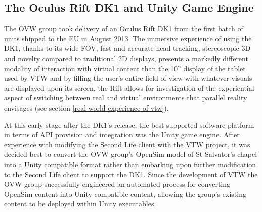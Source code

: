 


\subsection{The Oculus Rift DK1 and Unity Game Engine}

The OVW group took delivery of an Oculus Rift DK1 from the first batch of units shipped to the EU in August 2013. The immersive experience of using the DK1, thanks to its wide FOV, fast and accurate head tracking, stereoscopic 3D and novelty compared to traditional 2D displays, presents a markedly different modality of interaction with virtual content than the 10'' display of the tablet used by VTW and by filling the user's entire field of view with whatever visuals are displayed upon its screen, the Rift allows for investigation of the experiential aspect of switching between real and virtual environments that parallel reality envisages (see section \ref{real-world-experience-of-vtw}).

At this early stage after the DK1's release, the best supported software platform in terms of API provision and integration was the Unity game engine. After experience with modifying the Second Life client with the VTW project, it was decided best to convert the OVW group's OpenSim model of St Salvator's chapel into a Unity compatible format rather than embarking upon further modification to the Second Life client to support the DK1. Since the development of VTW the OVW group successfully engineered an automated process for converting OpenSim content into Unity compatible content, allowing the group's existing content to be deployed within Unity executables.

